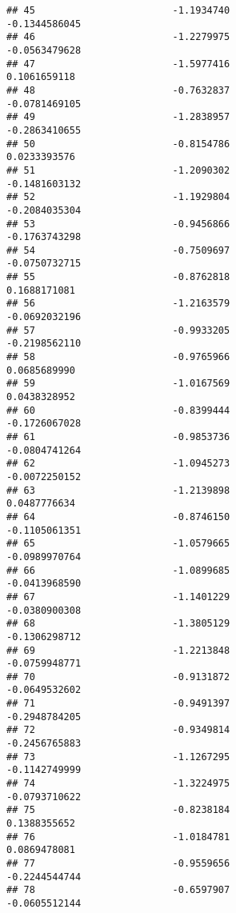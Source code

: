 \documentclass[
]{article}
\begin{document}
\begin{verbatim}
## 45                        -1.1934740                         -0.1344586045
## 46                        -1.2279975                         -0.0563479628
## 47                        -1.5977416                          0.1061659118
## 48                        -0.7632837                         -0.0781469105
## 49                        -1.2838957                         -0.2863410655
## 50                        -0.8154786                          0.0233393576
## 51                        -1.2090302                         -0.1481603132
## 52                        -1.1929804                         -0.2084035304
## 53                        -0.9456866                         -0.1763743298
## 54                        -0.7509697                         -0.0750732715
## 55                        -0.8762818                          0.1688171081
## 56                        -1.2163579                         -0.0692032196
## 57                        -0.9933205                         -0.2198562110
## 58                        -0.9765966                          0.0685689990
## 59                        -1.0167569                          0.0438328952
## 60                        -0.8399444                         -0.1726067028
## 61                        -0.9853736                         -0.0804741264
## 62                        -1.0945273                         -0.0072250152
## 63                        -1.2139898                          0.0487776634
## 64                        -0.8746150                         -0.1105061351
## 65                        -1.0579665                         -0.0989970764
## 66                        -1.0899685                         -0.0413968590
## 67                        -1.1401229                         -0.0380900308
## 68                        -1.3805129                         -0.1306298712
## 69                        -1.2213848                         -0.0759948771
## 70                        -0.9131872                         -0.0649532602
## 71                        -0.9491397                         -0.2948784205
## 72                        -0.9349814                         -0.2456765883
## 73                        -1.1267295                         -0.1142749999
## 74                        -1.3224975                         -0.0793710622
## 75                        -0.8238184                          0.1388355652
## 76                        -1.0184781                          0.0869478081
## 77                        -0.9559656                         -0.2244544744
## 78                        -0.6597907                         -0.0605512144

\end{verbatim}
\end{document}
